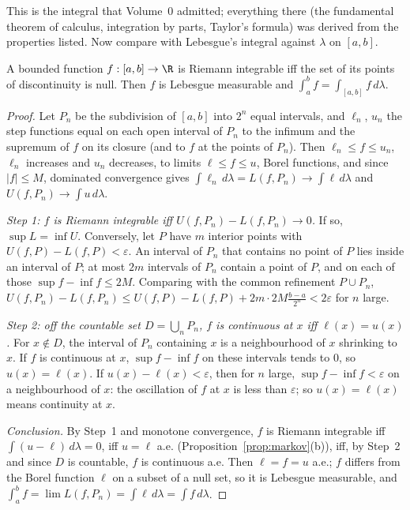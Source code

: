 This is the integral that Volume~0 admitted; everything there (the fundamental theorem of calculus, integration by parts, Taylor's formula) was
derived from the properties listed. Now compare with Lebesgue's integral against $\lambda$ on $[a,b]$.

\begin{theorem}[Lebesgue, 1902]\label{thm:lebesguecriterion}
A bounded function $f:[a,b]\to\R$ is Riemann integrable iff the set of its points of discontinuity is null. Then $f$ is Lebesgue measurable and
$\int_a^bf=\int_{[a,b]}f\,d\lambda$.
\end{theorem}
\begin{proof}
Let $P_n$ be the subdivision of $[a,b]$ into $2^n$ equal intervals, and $\ell_n$, $u_n$ the step functions equal on each open interval of $P_n$ to the infimum and the supremum of $f$ on
its closure (and to $f$ at the points of $P_n$). Then $\ell_n\le f\le u_n$, $\ell_n$ increases and $u_n$ decreases, to limits $\ell\le f\le u$, Borel functions, and since $|f|\le M$, dominated convergence
gives $\int\ell_n\,d\lambda=L(f,P_n)\to\int\ell\,d\lambda$ and $U(f,P_n)\to\int u\,d\lambda$.

\emph{Step 1: $f$ is Riemann integrable iff $U(f,P_n)-L(f,P_n)\to0$.} If so, $\sup L=\inf U$. Conversely, let $P$ have $m$ interior points with $U(f,P)-L(f,P)<\varepsilon$. An interval of
$P_n$ that contains no point of $P$ lies inside an interval of $P$; at most $2m$ intervals of $P_n$ contain a point of $P$, and on each of those $\sup f-\inf f\le2M$. Comparing with the common
refinement $P\cup P_n$, $U(f,P_n)-L(f,P_n)\le U(f,P)-L(f,P)+2m\cdot2M\frac{b-a}{2^n}<2\varepsilon$ for $n$ large.

\emph{Step 2: off the countable set $D=\bigcup_nP_n$, $f$ is continuous at $x$ iff $\ell(x)=u(x)$.} For $x\notin D$, the interval of $P_n$ containing $x$ is a neighbourhood of $x$ shrinking to $x$. If
$f$ is continuous at $x$, $\sup f-\inf f$ on these intervals tends to $0$, so $u(x)=\ell(x)$. If $u(x)-\ell(x)<\varepsilon$, then for $n$ large, $\sup f-\inf f<\varepsilon$ on a neighbourhood of $x$: the
oscillation of $f$ at $x$ is less than $\varepsilon$; so $u(x)=\ell(x)$ means continuity at $x$.

\emph{Conclusion.} By Step~1 and monotone convergence, $f$ is Riemann integrable iff $\int(u-\ell)\,d\lambda=0$, iff $u=\ell$ a.e. (Proposition~\ref{prop:markov}(b)), iff, by Step~2 and since $D$ is countable,
$f$ is continuous a.e. Then $\ell=f=u$ a.e.; $f$ differs from the Borel function $\ell$ on a subset of a null set, so it is Lebesgue measurable, and
$\int_a^bf=\lim L(f,P_n)=\int\ell\,d\lambda=\int f\,d\lambda$.
\end{proof}

